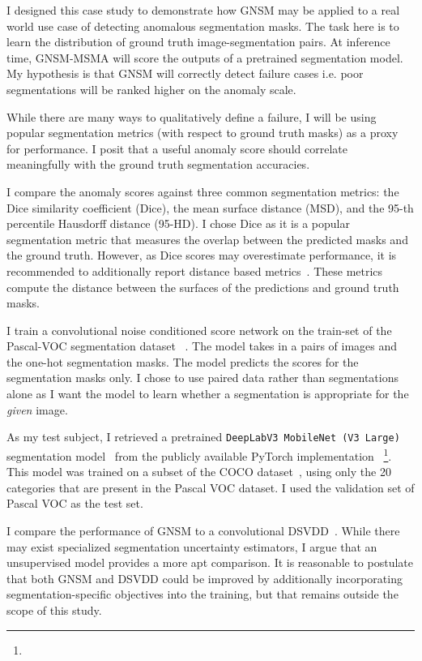 I designed this case study to demonstrate how GNSM may be applied to a real world use case of detecting anomalous segmentation masks.
The task here is to learn the distribution of ground truth image-segmentation pairs. At inference time, GNSM-MSMA will score the outputs of a pretrained segmentation model. My hypothesis is that GNSM will correctly detect failure cases i.e. poor segmentations will be ranked higher on the anomaly scale.

While there are many ways to qualitatively define a failure, I will be using popular segmentation metrics (with respect to ground truth masks) as a proxy for performance. I posit that a useful anomaly score should correlate meaningfully with the ground truth segmentation accuracies. 

I compare the anomaly scores against three common segmentation metrics: the Dice similarity coefficient (Dice), the mean surface distance (MSD), and the 95-th percentile Hausdorff distance (95-HD). I chose Dice as it is a popular segmentation metric that measures the overlap between the predicted masks and the ground truth. However, as Dice scores may overestimate performance, it is recommended to additionally report distance based metrics~\cite{valentini2014recommendations, taha2015metrics}. These metrics compute the distance between the surfaces of the predictions and ground truth masks.

I train a convolutional noise conditioned score network on the train-set of the Pascal-VOC segmentation dataset ~\cite{Everingham10}. The model takes in a pairs of images and the one-hot segmentation masks. The model predicts the scores for the segmentation masks only. I chose to use paired data rather than segmentations alone as I want the model to learn whether a segmentation is appropriate for the \textit{given} image. 

As my test subject, I retrieved a pretrained \texttt{DeepLabV3 MobileNet (V3 Large)} segmentation model~\cite{chen2017rethinking} from the publicly available PyTorch implementation ~\footnote{\tiny {}}. This model was trained on a subset of the COCO dataset~\cite{cocodataset}, using only the 20 categories that are present in the Pascal VOC dataset. I used the validation set of Pascal VOC as the test set.

I compare the performance of GNSM to a convolutional DSVDD~\cite{pmlr-v80-ruff18a}. While there may exist specialized segmentation uncertainty estimators, I argue that an unsupervised model provides a more apt comparison. It is reasonable to postulate that both GNSM and DSVDD could be improved by additionally incorporating segmentation-specific objectives into the training, but that remains outside the scope of this study. 

